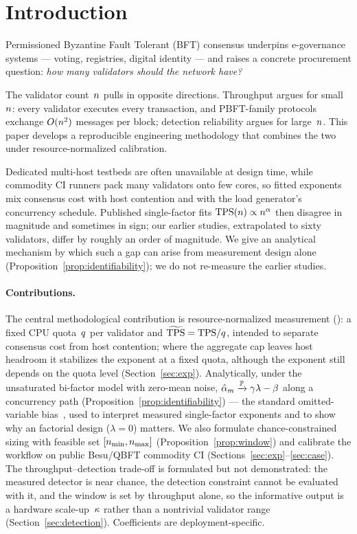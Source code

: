 \section{Introduction}
\label{sec:intro}

Permissioned Byzantine Fault Tolerant (BFT) consensus underpins \mbox{e-governance}
systems --- voting, registries, digital identity --- and raises a concrete
procurement question: \emph{how many validators should the network have?}

The validator count~$n$ pulls in opposite directions. Throughput argues for
small~$n$: every validator executes every transaction, and PBFT-family
protocols exchange $O(n^{2})$ messages per block; detection reliability argues
for large~$n$. This paper develops a reproducible engineering methodology that
combines the two under resource-normalized calibration.

Dedicated multi-host testbeds are often unavailable at design time, while
commodity CI runners pack many validators onto few cores, so fitted exponents
mix consensus cost with host contention and with the load generator's
concurrency schedule. Published single-factor fits
$\mathrm{TPS}(n)\propto n^{\alpha}$ then disagree in magnitude and sometimes in sign;
our earlier studies, extrapolated to sixty validators, differ by roughly an
order of magnitude. We give an analytical mechanism by which such a gap can
arise from measurement design alone (Proposition~\ref{prop:identifiability});
we do not re-measure the earlier studies.

\paragraph{Contributions.}
The central methodological contribution is resource-normalized measurement
(\RNM{}): a fixed CPU quota~$q$ per validator and $\widetilde{\mathrm{TPS}}=\mathrm{TPS}/q$, intended to
separate consensus cost from host contention; where the aggregate cap leaves
host headroom it stabilizes the exponent at a fixed quota, although the
exponent still depends on the quota level (Section~\ref{sec:exp}).
Analytically, under the unsaturated
bi-factor model with zero-mean noise,
$\hat{\alpha}_{m}\xrightarrow{\mathbb{P}}\gamma\lambda-\beta$ along a concurrency path
(Proposition~\ref{prop:identifiability}) --- the standard \mbox{omitted-variable}
bias~\cite{wooldridge2010}, used to interpret measured single-factor
exponents and to show why an \RNM{} factorial design ($\lambda=0$) matters. We
also formulate chance-constrained sizing with feasible set $[\nmin,\nmax]$
(Proposition~\ref{prop:window}) and calibrate the workflow on public Besu/QBFT
commodity CI (Sections~\ref{sec:exp}--\ref{sec:case}). The
throughput--detection trade-off is formulated but not demonstrated: the
measured detector is near chance, the detection constraint cannot be evaluated
with it, and the window is set by throughput alone, so the informative output
is a hardware scale-up~$\kappa$ rather than a nontrivial validator range
(Section~\ref{sec:detection}). Coefficients are deployment-specific.
